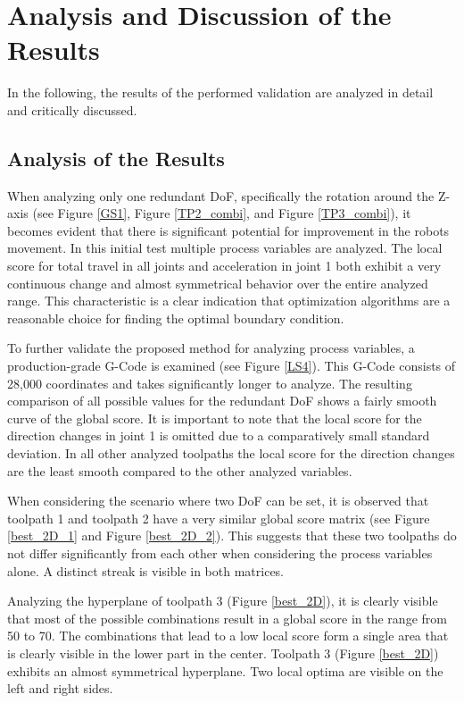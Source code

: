 


\newpage
\section{Analysis and Discussion of the Results}%
In the following, the results of the performed validation are analyzed in detail and critically discussed.

\subsection{Analysis of the Results}
When analyzing only one redundant \acrshort{DoF}, specifically the rotation around the Z-axis (see Figure \ref{GS1}, Figure \ref{TP2_combi}, and Figure \ref{TP3_combi}), it becomes evident that there is significant potential for improvement in the robots movement. In this initial test multiple process variables are analyzed. The local score for total travel in all joints and acceleration in joint 1 both exhibit a very continuous change and almost symmetrical behavior over the entire analyzed range. This characteristic is a clear indication that optimization algorithms are a reasonable choice for finding the optimal boundary condition.

To further validate the proposed method for analyzing process variables, a production-grade G-Code is examined (see Figure \ref{LS4}). This G-Code consists of 28,000 coordinates and takes significantly longer to analyze. The resulting comparison of all possible values for the redundant \acrshort{DoF} shows a fairly smooth curve of the global score. It is important to note that the local score for the direction changes in joint 1 is omitted due to a comparatively small standard deviation.  In all other analyzed toolpaths the local score for the direction changes are the least smooth compared to the other analyzed variables.


When considering the scenario where two \acrshort{DoF} can be set, it is observed that toolpath 1 and toolpath 2 have a very similar global score matrix (see Figure \ref{best_2D_1} and Figure \ref{best_2D_2}). This suggests that these two toolpaths do not differ significantly from each other when considering the process variables alone. A distinct streak is visible in both matrices.

Analyzing the hyperplane of toolpath 3 (Figure \ref{best_2D}), it is clearly visible that most of the possible combinations result in a global score in the range from 50 to 70. The combinations that lead to a low local score form a single area that is clearly visible in the lower part in the center.  Toolpath 3 (Figure \ref{best_2D}) exhibits an almost symmetrical hyperplane. Two local optima are visible on the left and right sides.


